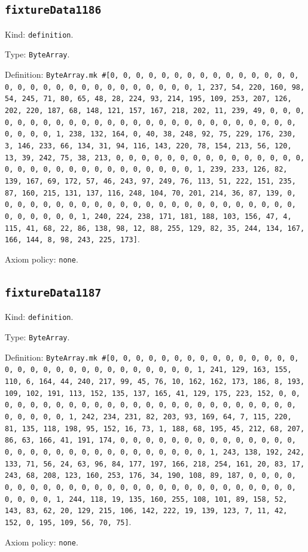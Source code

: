 \documentclass[11pt]{article}
\begin{document}
\subsection*{\texttt{fixtureData1186}}
\noindent Kind: \texttt{definition}.\par
\noindent Type: \texttt{ByteArray}.\par
\noindent Definition: \texttt{ByteArray.mk \#[0, 0, 0, 0, 0, 0, 0, 0, 0, 0, 0, 0, 0, 0, 0, 0, 0, 0, 0, 0, 0, 0, 0, 0, 0, 0, 0, 0, 0, 0, 1, 237, 54, 220, 160, 98, 54, 245, 71, 80, 65, 48, 28, 224, 93, 214, 195, 109, 253, 207, 126, 202, 220, 187, 68, 148, 121, 157, 167, 218, 202, 11, 239, 49, 0, 0, 0, 0, 0, 0, 0, 0, 0, 0, 0, 0, 0, 0, 0, 0, 0, 0, 0, 0, 0, 0, 0, 0, 0, 0, 0, 0, 0, 0, 1, 238, 132, 164, 0, 40, 38, 248, 92, 75, 229, 176, 230, 3, 146, 233, 66, 134, 31, 94, 116, 143, 220, 78, 154, 213, 56, 120, 13, 39, 242, 75, 38, 213, 0, 0, 0, 0, 0, 0, 0, 0, 0, 0, 0, 0, 0, 0, 0, 0, 0, 0, 0, 0, 0, 0, 0, 0, 0, 0, 0, 0, 0, 0, 1, 239, 233, 126, 82, 139, 167, 69, 172, 57, 46, 243, 97, 249, 76, 113, 51, 222, 151, 235, 87, 160, 215, 131, 137, 116, 248, 104, 70, 201, 214, 36, 87, 139, 0, 0, 0, 0, 0, 0, 0, 0, 0, 0, 0, 0, 0, 0, 0, 0, 0, 0, 0, 0, 0, 0, 0, 0, 0, 0, 0, 0, 0, 0, 1, 240, 224, 238, 171, 181, 188, 103, 156, 47, 4, 115, 41, 68, 22, 86, 138, 98, 12, 88, 255, 129, 82, 35, 244, 134, 167, 166, 144, 8, 98, 243, 225, 173]}.\par
\noindent Axiom policy: \texttt{none}.\par
\subsection*{\texttt{fixtureData1187}}
\noindent Kind: \texttt{definition}.\par
\noindent Type: \texttt{ByteArray}.\par
\noindent Definition: \texttt{ByteArray.mk \#[0, 0, 0, 0, 0, 0, 0, 0, 0, 0, 0, 0, 0, 0, 0, 0, 0, 0, 0, 0, 0, 0, 0, 0, 0, 0, 0, 0, 0, 0, 1, 241, 129, 163, 155, 110, 6, 164, 44, 240, 217, 99, 45, 76, 10, 162, 162, 173, 186, 8, 193, 109, 102, 191, 113, 152, 135, 137, 165, 41, 129, 175, 223, 152, 0, 0, 0, 0, 0, 0, 0, 0, 0, 0, 0, 0, 0, 0, 0, 0, 0, 0, 0, 0, 0, 0, 0, 0, 0, 0, 0, 0, 0, 0, 1, 242, 234, 231, 82, 203, 93, 169, 64, 7, 115, 220, 81, 135, 118, 198, 95, 152, 16, 73, 1, 188, 68, 195, 45, 212, 68, 207, 86, 63, 166, 41, 191, 174, 0, 0, 0, 0, 0, 0, 0, 0, 0, 0, 0, 0, 0, 0, 0, 0, 0, 0, 0, 0, 0, 0, 0, 0, 0, 0, 0, 0, 0, 0, 1, 243, 138, 192, 242, 133, 71, 56, 24, 63, 96, 84, 177, 197, 166, 218, 254, 161, 20, 83, 17, 243, 68, 208, 123, 160, 253, 176, 34, 190, 108, 89, 187, 0, 0, 0, 0, 0, 0, 0, 0, 0, 0, 0, 0, 0, 0, 0, 0, 0, 0, 0, 0, 0, 0, 0, 0, 0, 0, 0, 0, 0, 0, 0, 1, 244, 118, 19, 135, 160, 255, 108, 101, 89, 158, 52, 143, 83, 62, 20, 129, 215, 106, 142, 222, 19, 139, 123, 7, 11, 42, 152, 0, 195, 109, 56, 70, 75]}.\par
\noindent Axiom policy: \texttt{none}.\par
\end{document}
